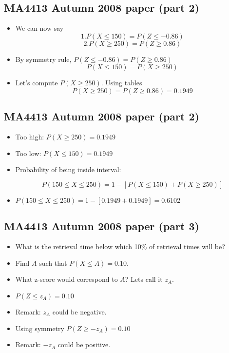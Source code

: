 {
\subsection*{MA4413 Autumn 2008 paper (part 2)}
\begin{itemize}
\item We can now say
\[ 1. P( X \leq 150) = P( Z \leq -0.86)\]
\[ 2. P( X \geq 250) = P( Z \geq 0.86)\]
\item By symmetry rule, $P( Z \leq -0.86) = P( Z \geq 0.86)$
\[ P( X \leq 150) =  P( X \geq 250) \]
\item Let's compute $P( X \geq 250)$. Using tables
\[P( X \geq 250) = P( Z \geq 0.86) = 0.1949 \]
\end{itemize}
}
{
\subsection*{MA4413 Autumn 2008 paper (part 2)}
\begin{itemize}
\item Too high: $P( X \geq 250) = 0.1949 $
\item Too low:  $P( X \leq 150) = 0.1949 $
\item Probability of being inside interval:

\[ P(150 \leq X \leq 250) = 1- [ P( X \leq 150) + P( X \geq 250)] \]

\item $P(150 \leq X \leq 250) = 1- [ 0.1949 + 0.1949 ] = \boldsymbol{0.6102}$

\end{itemize}
}
{
\subsection*{MA4413 Autumn 2008 paper (part 3)}
\begin{itemize}
\item What is the retrieval time below which 10\% of retrieval times will be?
\item Find $A$ such that $P(X \leq A) = 0.10$.
\item What z-score would correspond to $A$? Lets call it $z_A$.
\item $P(Z  \leq z_A) = 0.10$
\item Remark: $z_A$ could be negative.
\item Using symmetry $P(Z \geq -z_A) = 0.10$
\item Remark: $-z_A$ could be positive.
\end{itemize}
}

